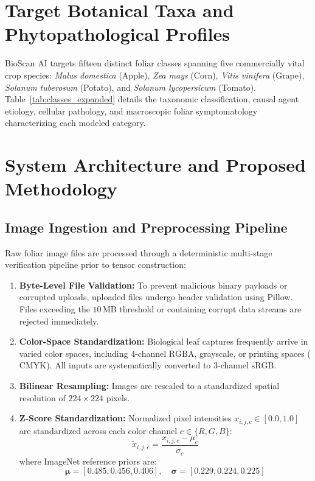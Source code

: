 \documentclass[11pt,a4paper]{article}
\begin{document}
\section{Target Botanical Taxa and Phytopathological Profiles}

BioScan AI targets fifteen distinct foliar classes spanning five commercially vital crop species: \textit{Malus domestica} (Apple), \textit{Zea mays} (Corn), \textit{Vitis vinifera} (Grape), \textit{Solanum tuberosum} (Potato), and \textit{Solanum lycopersicum} (Tomato). Table~\ref{tab:classes_expanded} details the taxonomic classification, causal agent etiology, cellular pathology, and macroscopic foliar symptomatology characterizing each modeled category.

\section{System Architecture and Proposed Methodology}

\subsection{Image Ingestion and Preprocessing Pipeline}
Raw foliar image files are processed through a deterministic multi-stage verification pipeline prior to tensor construction:
\begin{enumerate}
    \item \textbf{Byte-Level File Validation:} To prevent malicious binary payloads or corrupted uploads, uploaded files undergo header validation using Pillow. Files exceeding the $10\,\text{MB}$ threshold or containing corrupt data streams are rejected immediately.
    \item \textbf{Color-Space Standardization:} Biological leaf captures frequently arrive in varied color spaces, including 4-channel $\text{RGBA}$, grayscale, or printing spaces ($\text{CMYK}$). All inputs are systematically converted to 3-channel $\text{sRGB}$.
    \item \textbf{Bilinear Resampling:} Images are rescaled to a standardized spatial resolution of $224 \times 224$ pixels.
    \item \textbf{Z-Score Standardization:} Normalized pixel intensities $x_{i, j, c} \in [0.0, 1.0]$ are standardized across each color channel $c \in \{R, G, B\}$:
    \begin{equation}
    \tilde{x}_{i, j, c} = \frac{x_{i, j, c} - \mu_c}{\sigma_c}
    \label{eq:channel_norm}
    \end{equation}
    where ImageNet reference priors are:
    \begin{equation}
    \boldsymbol{\mu} = [0.485, 0.456, 0.406], \quad \boldsymbol{\sigma} = [0.229, 0.224, 0.225]
    \end{equation}
\end{enumerate}
\end{document}
